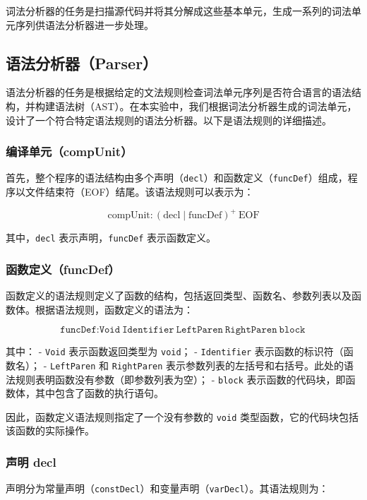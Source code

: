 \documentclass[../main.tex]{subfiles}
\begin{document}
词法分析器的任务是扫描源代码并将其分解成这些基本单元，生成一系列的词法单元序列供语法分析器进一步处理。

\subsection{语法分析器（Parser）}

语法分析器的任务是根据给定的文法规则检查词法单元序列是否符合语言的语法结构，并构建语法树（AST）。在本实验中，我们根据词法分析器生成的词法单元，设计了一个符合特定语法规则的语法分析器。以下是语法规则的详细描述。

\subsubsection{编译单元（compUnit）}

首先，整个程序的语法结构由多个声明（\texttt{decl}）和函数定义（\texttt{funcDef}）组成，程序以文件结束符（EOF）结尾。该语法规则可以表示为：

\[
	\text{compUnit} \colon (\text{decl} \mid \text{funcDef})^+ \ \text{EOF}
\]

其中，\texttt{decl} 表示声明，\texttt{funcDef} 表示函数定义。

\subsubsection{函数定义（funcDef）}

函数定义的语法规则定义了函数的结构，包括返回类型、函数名、参数列表以及函数体。根据语法规则，函数定义的语法为：

\[
\texttt{funcDef} \colon \texttt{Void} \ \texttt{Identifier} \ \texttt{LeftParen} \ \texttt{RightParen} \ \texttt{block}
\]

其中：
- \texttt{Void} 表示函数返回类型为 \texttt{void}；
- \texttt{Identifier} 表示函数的标识符（函数名）；
- \texttt{LeftParen} 和 \texttt{RightParen} 表示参数列表的左括号和右括号。此处的语法规则表明函数没有参数（即参数列表为空）；
- \texttt{block} 表示函数的代码块，即函数体，其中包含了函数的执行语句。

因此，函数定义语法规则指定了一个没有参数的 \texttt{void} 类型函数，它的代码块包括该函数的实际操作。


\subsubsection{声明 decl}

声明分为常量声明（\texttt{constDecl}）和变量声明（\texttt{varDecl}）。其语法规则为：
\end{document}
